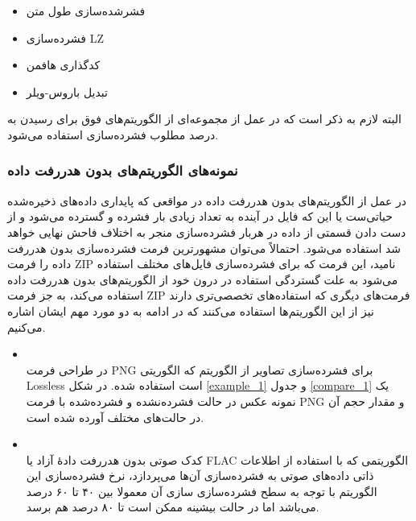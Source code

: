 \begin{itemize}
	\item فشرشده‌سازی طول متن 
	\item فشرده‌سازی LZ
	\item کدگذاری هافمن 
	\item تبدیل باروس-ویلر 
\end{itemize}

البته لازم به ذکر است که در عمل از مجموعه‌ای از الگوریتم‌های فوق برای رسیدن به درصد مطلوب فشرده‌سازی استفاده می‌شود.

\subsubsection{نمونه‌های الگوریتم‌های بدون هدررفت داده}
در عمل از الگوریتم‌های بدون هدررفت داده در مواقعی که 
پایداری داده‌های ذخیره‌شده حیاتی‌ست یا این که فایل در آینده به تعداد زیادی بار فشرده و گسترده می‌شود و از دست دادن قسمتی از داده در
هربار فشرده‌سازی منجر به اختلاف فاحش نهایی خواهد شد استفاده می‌شود. احتمالاً می‌توان مشهورترین فرمت فشرده‌سازی بدون هدررفت داده را
فرمت 
ZIP
نامید، این فرمت که برای فشرده‌سازی فایل‌های مختلف استفاده می‌شود به علت گستردگی استفاده در درون خود از 
الگوریتم‌های بدون هدررفت داده استفاده می‌کند، به جز فرمت ZIP 
فرمت‌های دیگری که استفاده‌های تخصصی‌تری دارند نیز از این الگوریتم‌ها استفاده می‌کنند که در ادامه به دو مورد مهم ایشان اشاره می‌کنیم.

\begin{itemize}
	\item {}\\
	در طراحی فرمت PNG برای فشرده‌سازی تصاویر از الگوریتم
	که الگوریتی Lossless است استفاده شده. 
	در 
	شکل 	\ref{example_1} و 
	جدول 	\ref{compare_1} 
	یک نمونه عکس در حالت فشرده‌نشده و فشرده‌شده با فرمت PNG
	و مقدار حجم آن در حالت‌های مختلف آورده شده است.

	\item {}\\
	کدک صوتی بدون هدررفت دادهٔ آزاد  یا FLAC
	الگوریتمی که با استفاده از اطلاعات ذاتی داده‌های صوتی به فشرده‌سازی آن‌ها می‌پردازد، نرخ فشرده‌سازی این الگوریتم با توجه به 
	سطح فشرده‌سازی سازی آن معمولا بین ۴۰ تا ۶۰ درصد می‌باشد اما در حالت بیشینه ممکن است تا ۸۰ درصد هم برسد.
	
\end{itemize}

